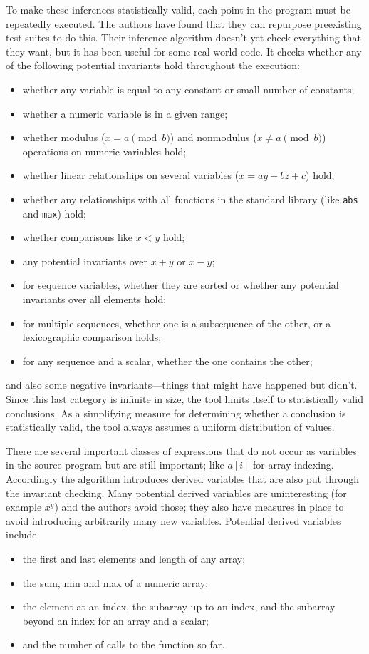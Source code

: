 \documentclass{article}
\begin{document}
\begin{multicols}{2}
To make these inferences statistically valid, each point in the
program must be repeatedly executed.  The authors have found that they
can repurpose preexisting test suites to do this.  Their inference
algorithm doesn't yet check everything that they want, but it has been
useful for some real world code.  It checks whether any of the
following potential invariants hold throughout the execution:
\begin{itemize}
\item whether any variable is equal to any constant or small number of
  constants;
\item whether a numeric variable is in a given range;
\item whether modulus ($x = a \pmod b$) and nonmodulus ($x \neq a
  \pmod b$) operations on numeric variables hold;
\item whether linear relationships on several variables ($x = a y + b
  z + c$) hold;
\item whether any relationships with all functions in the standard
  library (like \texttt{abs} and \texttt{max}) hold;
\item whether comparisons like $x < y$ hold;
\item any potential invariants over $x + y$ or $x - y$;
\item for sequence variables, whether they are sorted or whether any
  potential invariants over all elements hold;
\item for multiple sequences, whether one is a subsequence of the
  other, or a lexicographic comparison holds;
\item for any sequence and a scalar, whether the one contains the other;
\end{itemize}
and also some negative invariants---things that might have happened
but didn't.  Since this last category is infinite in size, the tool
limits itself to statistically valid conclusions.  As a simplifying
measure for determining whether a conclusion is statistically valid,
the tool always assumes a uniform distribution of values.

There are several important classes of expressions that do not occur
as variables in the source program but are still important; like
$a[i]$ for array indexing.  Accordingly the algorithm introduces
derived variables that are also put through the invariant checking.
Many potential derived variables are uninteresting (for example $x^y$)
and the authors avoid those; they also have measures in place to avoid
introducing arbitrarily many new variables.  Potential derived
variables include
\begin{itemize}
\item the first and last elements and length of any array;
\item the sum, min and max of a numeric array;
\item the element at an index, the subarray up to an index, and the
  subarray beyond an index for an array and a scalar;
\item and the number of calls to the function so far.
\end{itemize}


\end{multicols}
\end{document}
